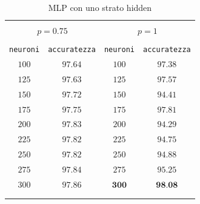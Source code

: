 \documentclass[11pt,a4paper,twoside,
openright]{book}
\begin{document}
\vspace*{\fill}
\begin{center}

\begin{table}[]
  \small
  \caption{MLP con uno strato hidden}\label{tab:tab1}
\begin{center}
\begin{tabular}{@{}cc|cc@{}}

\hline\\[-11pt]
\hline\\[-6.5pt]
\multicolumn{2}{c}{\bf $p=0.75$} & \multicolumn{2}{c}{\bf $p=1$ } \\[5pt]
\hline\\[-11pt]
\texttt{neuroni} & \texttt{accuratezza} & \texttt{neuroni} & \texttt{accuratezza} \\[1pt]
$100$ & $97.64$ & $100$ & $97.38$ \\ [1pt]
$125$ & $97.63$ & $125$ & $97.57$ \\ [1pt]
$150$ & $97.72$ & $150$ & $94.41$ \\ [1pt]
$175$ & $97.75$ & $175$ & $97.81$ \\ [1pt]
$200$ & $97.83$ & $200$ & $94.29$ \\ [1pt]
$225$ & $97.82$ & $225$ & $94.75$ \\ [1pt]
$250$ & $97.82$ & $250$ & $94.88$ \\ [1pt]
$275$ & $97.84$ & $275$ & $95.25$ \\ [1pt]
$300$ & $97.86$ & $\textbf{300}$ & $\textbf{98.08}$ \\ [1pt]
\hline\\[-11pt]
\hline\\[-8pt]
\end{tabular}\\[5pt]
\end{center}
\normalsize
\end{table}
\end{center}
\end{document}
